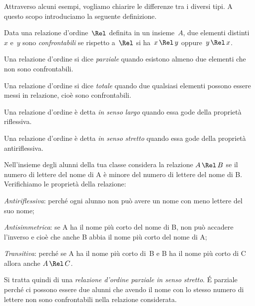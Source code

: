 Attraverso alcuni esempi, vogliamo chiarire le differenze tra i diversi tipi. A questo scopo introduciamo la seguente definizione.

\begin{definizione}
Data una relazione d'ordine~$\Rel$ definita in un insieme~$A$, due elementi distinti~$x$ e~$y$ sono \emph{confrontabili} se rispetto a~$\Rel$ si ha~$x \,\Rel\, y$ oppure~$y \,\Rel\, x$.
\end{definizione}

\begin{definizione}
Una relazione d'ordine si dice \emph{parziale} quando esistono almeno due elementi che non sono confrontabili.
\end{definizione}

\begin{definizione}
Una relazione d'ordine si dice \emph{totale} quando due qualsiasi elementi possono essere messi in relazione, cioè sono confrontabili.
\end{definizione}

\begin{definizione}
Una relazione d'ordine è detta \emph{in senso largo} quando essa gode della proprietà riflessiva.
\end{definizione}

\begin{definizione}
Una relazione d'ordine è detta \emph{in senso stretto} quando essa gode della proprietà antiriflessiva.
\end{definizione}

\begin{center}
 
\end{center}

\begin{exrig}
 \begin{esempio}
Nell'insieme degli alunni della tua classe considera la relazione $A \, \Rel \, B$ se il numero di lettere del nome di A è minore del numero di lettere del nome di B.
Verifichiamo le proprietà della relazione:
\begin{enumerate*}
\item \emph{Antiriflessiva}: perché ogni alunno non può avere un nome con meno lettere del suo nome;
\item \emph{Antisimmetrica}: se A ha il nome più corto del nome di B, non può accadere l'inverso e cioè che anche B abbia il nome più corto del nome di A;
\item \emph{Transitiva}: perché se A ha il nome più corto di~B e B ha il nome più corto di C allora anche $A \, \Rel \, C$.
\end{enumerate*}
Si tratta quindi di una \emph{relazione d'ordine parziale in senso stretto}. É parziale perché ci possono essere due alunni che avendo il nome con lo stesso numero di lettere non sono confrontabili nella relazione considerata.
 \end{esempio}
\end{exrig}

